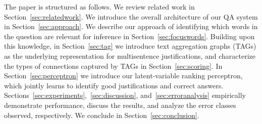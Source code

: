 The paper is structured as follows. We review related work in Section~\ref{sec:relatedwork}. 
We introduce the overall architecture of our QA system in Section~\ref{sec:approach}. We describe our approach of identifying which words in the question are relevant for inference in Section~\ref{sec:focuswords}. Building upon this knowledge, in Section~\ref{sec:tag} we introduce text aggregation graphs (TAGs) as the underlying representation for multisentence justifications, and characterize the types of connections captured by TAGs in Section~\ref{sec:scoring}. 
 In Section~\ref{sec:perceptron} we introduce our latent-variable ranking perceptron, which jointly learns to identify good justifications and correct answers. Sections~\ref{sec:experiments},~\ref{sec:discussion}, and~\ref{sec:erroranalysis} empirically demonstrate performance, discuss the results, and analyze the error classes observed, respectively. We conclude in Section~\ref{sec:conclusion}. 



